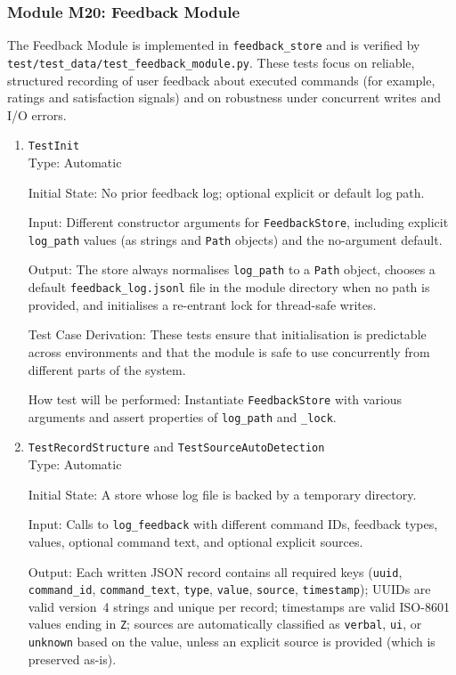 \documentclass[12pt, titlepage]{article}
\begin{document}
\subsubsection{Module M20: Feedback Module}

The Feedback Module is implemented in \texttt{feedback\_store} and is verified by \texttt{test/test\_data/test\_feedback\_module.py}. These tests focus on reliable, structured recording of user feedback about executed commands (for example, ratings and satisfaction signals) and on robustness under concurrent writes and I/O errors.

\begin{enumerate}
\item{\texttt{TestInit}\\}
Type:  Automatic

Initial State: No prior feedback log; optional explicit or default log path.

Input: Different constructor arguments for \texttt{FeedbackStore}, including explicit \texttt{log\_path} values (as strings and \texttt{Path} objects) and the no-argument default.

Output: The store always normalises \texttt{log\_path} to a \texttt{Path} object, chooses a default \texttt{feedback\_log.jsonl} file in the module directory when no path is provided, and initialises a re-entrant lock for thread-safe writes.

Test Case Derivation: These tests ensure that initialisation is predictable across environments and that the module is safe to use concurrently from different parts of the system.

How test will be performed: Instantiate \texttt{FeedbackStore} with various arguments and assert properties of \texttt{log\_path} and \texttt{\_lock}.

\item{\texttt{TestRecordStructure} and \texttt{TestSourceAutoDetection}\\}
Type:  Automatic

Initial State: A store whose log file is backed by a temporary directory.

Input: Calls to \texttt{log\_feedback} with different command IDs, feedback types, values, optional command text, and optional explicit sources.

Output: Each written JSON record contains all required keys (\texttt{uuid}, \texttt{command\_id}, \texttt{command\_text}, \texttt{type}, \texttt{value}, \texttt{source}, \texttt{timestamp}); UUIDs are valid version~4 strings and unique per record; timestamps are valid ISO-8601 values ending in \texttt{Z}; sources are automatically classified as \texttt{verbal}, \texttt{ui}, or \texttt{unknown} based on the value, unless an explicit source is provided (which is preserved as-is).


\end{enumerate}
\end{document}
